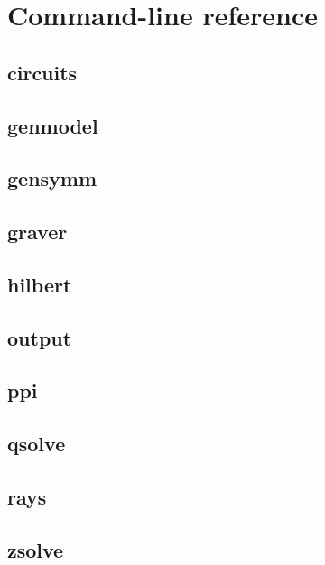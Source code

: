 \chapter{Command-line reference}
\label{Chapter: Reference}

\section{circuits}
{\small
}

\clearpage
\section{genmodel}
{\small
}

\clearpage
\section{gensymm}
{\small
}

\clearpage
\section{graver}

{\small
}

\clearpage
\section{hilbert}

{\small
}

\clearpage
\section{output}
{\small
}

\clearpage
\section{ppi}
{\small
}

\clearpage
\section{qsolve}
{\small
}

\clearpage
\section{rays}
{\small
}

\clearpage
\section{zsolve}
{\small
}


